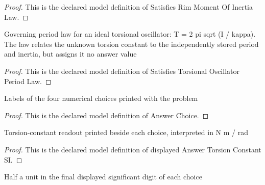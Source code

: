 \begin{proof}
  This is the declared model definition of Satisfies Rim Moment Of Inertia Law.
\end{proof}
\begin{definition}
  \label{def:physics:phyx-mini-0228:phyxminiproblems-problemphyxmini0228-satisfiestorsionaloscillatorperiodlaw}
  Governing period law for an ideal torsional oscillator: T = 2 pi sqrt (I / kappa). The law relates the unknown torsion constant to the independently stored period and inertia, but assigns it no answer value
\end{definition}
\begin{proof}
  This is the declared model definition of Satisfies Torsional Oscillator Period Law.
\end{proof}
\begin{definition}
  \label{def:physics:phyx-mini-0228:phyxminiproblems-problemphyxmini0228-answerchoice}
  Labels of the four numerical choices printed with the problem
\end{definition}
\begin{proof}
  This is the declared model definition of Answer Choice.
\end{proof}
\begin{definition}
  \label{def:physics:phyx-mini-0228:phyxminiproblems-problemphyxmini0228-displayedanswertorsionconstantsi}
  Torsion-constant readout printed beside each choice, interpreted in N m / rad
\end{definition}
\begin{proof}
  This is the declared model definition of displayed Answer Torsion Constant SI.
\end{proof}
\begin{definition}
  \label{def:physics:phyx-mini-0228:phyxminiproblems-problemphyxmini0228-displayedanswertolerancesi}
  Half a unit in the final displayed significant digit of each choice
\end{definition}
